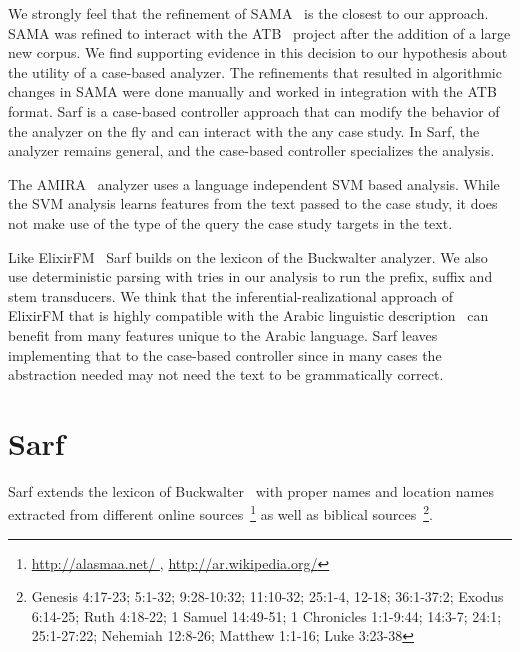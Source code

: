 \documentclass[11pt,letterpaper]{article}
\begin{document}

We strongly feel that the refinement of SAMA~\cite{Maamouri:10} 
is the closest to our approach. SAMA was refined to interact with
the ATB~\cite{Maamouri:04} project after the addition of a large 
new corpus. We find supporting evidence in this decision to our hypothesis
about the utility of a case-based analyzer. 
The refinements that resulted in algorithmic changes in SAMA were 
done manually and worked in integration with the ATB format. 
Sarf is a case-based controller approach that can modify 
the behavior of the analyzer on the fly and can interact
with the any case study. In Sarf, the analyzer remains general, and the 
case-based controller specializes the analysis.

The AMIRA~\cite{Diab:07} analyzer uses 
a language independent SVM based analysis. 
While the SVM analysis learns features from the text passed to the case
study, it does not make use of the type of the query the 
case study targets in the text. 

Like ElixirFM~\cite{Otakar:07} Sarf builds on the lexicon
of the Buckwalter analyzer. 
We also use deterministic parsing with tries in our analysis 
to run the prefix, suffix and stem transducers. 
We think that the inferential-realizational approach 
of ElixirFM
that is highly compatible with the Arabic linguistic 
description~\cite{Badawi:04}
can benefit from many features unique to the Arabic language.
Sarf leaves implementing that to the case-based controller
since in many cases the abstraction needed may not need the 
text to be grammatically correct.

\section{Sarf}
\label{sec:sarf}

Sarf extends the lexicon of Buckwalter~ with 
proper names and location names extracted from different online 
sources~\footnote{\href{http://alasmaa.net/}{http://alasmaa.net/ }, 
\href{http://ar.wikipedia.org/}{http://ar.wikipedia.org/}}
as well as biblical sources~\footnote{Genesis 4:17-23; 5:1-32; 9:28-10:32; 11:10-32; 25:1-4, 12-18; 36:1-37:2; Exodus 6:14-25; Ruth 4:18-22; 1 Samuel 14:49-51; 1 Chronicles 1:1-9:44; 14:3-7; 24:1; 25:1-27:22; Nehemiah 12:8-26; Matthew 1:1-16; Luke 3:23-38}.
\end{document}
